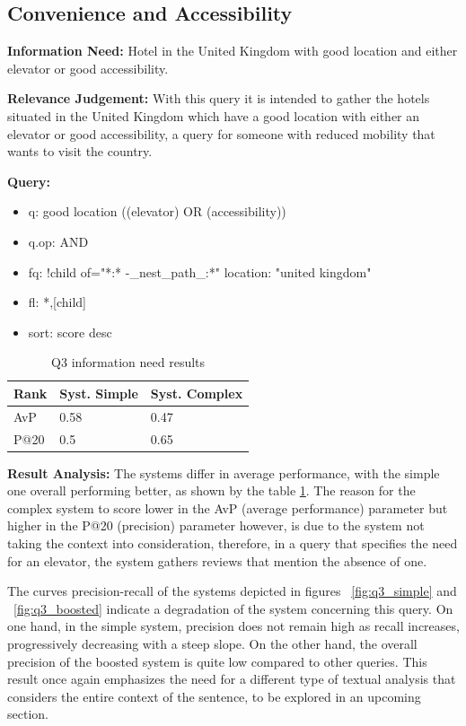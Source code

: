 \documentclass[sigconf]{acmart}
\begin{document}
\subsection{Convenience and Accessibility}

\textbf{Information Need:} Hotel in the United Kingdom with good location and either elevator or good accessibility.

\textbf{Relevance Judgement:} With this query it is intended to gather the hotels situated in the United Kingdom which have a good location with either an elevator or good accessibility, a query for someone with reduced mobility that wants to visit the country.

\textbf{Query:}

\begin{itemize}
    \item q: good location ((elevator) OR (accessibility))
    \item q.op: AND
    \item fq: {!child of="*:* -\_nest\_path\_:*"} location: "united kingdom"
    \item fl: *,[child]
    \item sort: score desc
\end{itemize}

\begin{table}[h]
\caption{Q3 information need results}
\label{tab:q3}
\begin{tabular}{lll}
\toprule
Rank & Syst. Simple & Syst. Complex\\
\midrule
AvP & 0.58 & 0.47  \\
P@20 & 0.5 & 0.65 \\
\bottomrule
\end{tabular}
\end{table}

\textbf{Result Analysis:} The systems differ in average performance, with the simple one overall performing better, as shown by the table \ref{tab:q3}. The reason for the complex system to score lower in the AvP (average performance) parameter but higher in the P@20 (precision) parameter however, is due to the system not taking the context into consideration, therefore, in a query that specifies the need for an elevator, the system gathers reviews that mention the absence of one.

The curves precision-recall of the systems depicted in figures ~\ref{fig:q3_simple} and ~\ref{fig:q3_boosted} indicate a degradation of the system concerning this query. On one hand, in the simple system, precision does not remain high as recall increases, progressively decreasing with a steep slope. On the other hand, the overall precision of the boosted system is quite low compared to other queries. This result once again emphasizes the need for a different type of textual analysis that considers the entire context of the sentence, to be explored in an upcoming section.
\end{document}
